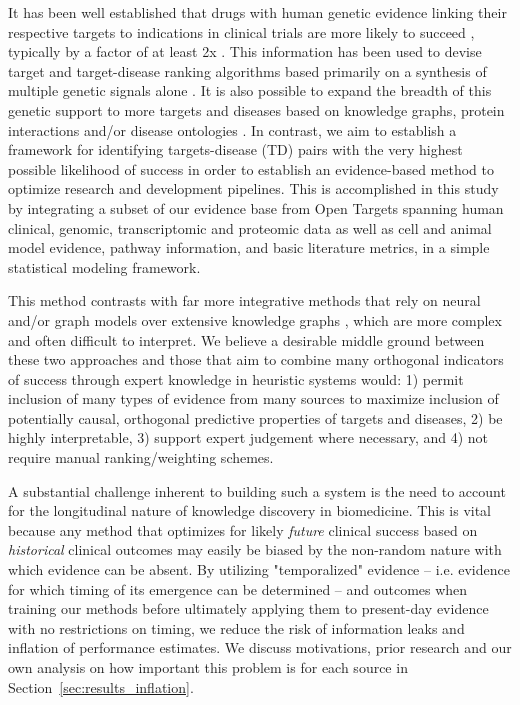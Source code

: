 \documentclass{article}
\begin{document}
It has been well established that drugs with human genetic evidence linking their respective targets to indications in clinical trials are more likely to succeed \cite{PMID:24833294,PMID:35804044,Razuvayevskaya2023.02.07.23285407,PMID:37803084,PMID:36963162}, typically by a factor of at least 2x \cite{Minikel2023.06.23.23291765,Nelson2015-eg,King2019-rc,PMID:30652614,Sadler2023-xd}. This information has been used to devise target and target-disease ranking algorithms based primarily on a synthesis of multiple genetic signals alone \cite{PMID:38172303,Koscielny2017-rr,PMID:31253980}. It is also possible to expand the breadth of this genetic support to more targets and diseases based on knowledge graphs, protein interactions and/or disease ontologies \cite{PMID:33262371,Bao2022-bq,Sadler2023-xd,PMID:36087372,PMID:36823319}. In contrast, we aim to establish a framework for identifying targets-disease (TD) pairs with the very highest possible likelihood of success in order to establish an evidence-based method to optimize research and development pipelines. This is accomplished in this study by integrating a subset of our evidence base from Open Targets \cite{Koscielny2017-rr} spanning human clinical, genomic, transcriptomic and proteomic data as well as cell and animal model evidence, pathway information, and basic literature metrics, in a simple statistical modeling framework. 

This method contrasts with far more integrative methods that rely on neural and/or graph models over extensive knowledge graphs \cite{Paliwal2020-hr,PMID:33741907,pittala2020relationweighted,PMID:32750869}, which are more complex and often difficult to interpret. We believe a desirable middle ground between these two approaches and those that aim to combine many orthogonal indicators of success through expert knowledge in heuristic systems \cite{PMID:38404138,Koscielny2017-rr} would: 1) permit inclusion of many types of evidence from many sources to maximize inclusion of potentially causal, orthogonal predictive properties of targets and diseases, 2) be highly interpretable, 3) support expert judgement where necessary, and 4) not require manual ranking/weighting schemes. 

A substantial challenge inherent to building such a system is the need to account for the longitudinal nature of knowledge discovery in biomedicine. This is vital because any method that optimizes for likely \textit{future} clinical success based on \textit{historical} clinical outcomes may easily be biased by the non-random nature with which evidence can be absent. By utilizing "temporalized" evidence -- i.e. evidence for which timing of its emergence can be determined -- and outcomes when training our methods before ultimately applying them to present-day evidence with no restrictions on timing, we reduce the risk of information leaks and inflation of performance estimates. We discuss motivations, prior research and our own analysis on how important this problem is for each source in Section~\ref{sec:results_inflation}.
\end{document}
